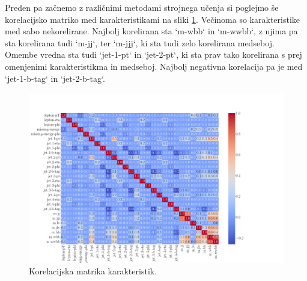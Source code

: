 \documentclass{article}
\begin{document}
Preden pa začnemo z različnimi metodami strojnega učenja si poglejmo še korelacijsko matriko med karakteristikami na sliki \ref{fig:correlation_matrix}. Večinoma so karakteristike med sabo nekorelirane. Najbolj korelirana sta `m-wbb` in `m-wwbb`, z njima pa sta korelirana tudi `m-jj`, ter `m-jjj`, ki sta tudi zelo korelirana medseboj. Omembe vredna sta tudi `jet-1-pt` in `jet-2-pt`, ki sta prav tako korelirana s prej omenjenimi karakteristikma in medseboj. Najbolj negativna korelacija pa je med `jet-1-b-tag` in `jet-2-b-tag`.

\begin{figure}[H]
\centering
	\includegraphics[width=\linewidth]{images/correlation.pdf}
	\caption{Korelacijska matrika karakteristik.}
	\label{fig:correlation_matrix}
\end{figure}
\end{document}
